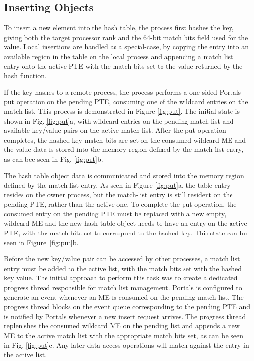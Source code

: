  

\subsection{Inserting Objects}

To insert a new element into the hash table, the process first hashes the key,
giving both the target processor rank and the 64-bit match bits field used for
the value. Local insertions are handled as a special-case, by copying the entry
into an available region in the table on the local process and appending a
match list entry onto the active PTE with the match bits set to the value
returned by the hash function.

If the key hashes to a remote process, the process performs a one-sided Portals
put operation on the pending PTE, consuming one of the wildcard entries on the
match list. This process is demonstrated in Figure \ref{fig:put}. The initial
state is shown in Fig. \ref{fig:put}a, with wildcard entries on the pending
match list and available key/value pairs on the active match list. After the
put operation completes, the hashed key match bits are set on the consumed
wildcard ME and the value data is stored into the memory region defined by the
match list entry, as can bee seen in Fig. \ref{fig:put}b.

The hash table object data is communicated and stored into the memory region defined by
the match list entry. As seen in Figure \ref{fig:put}a, the table entry
resides on the owner process, but the match-list entry is still resident
on the pending PTE, rather than the active one. To complete the put operation,
the consumed entry on the pending PTE must be replaced with a new empty,
wildcard ME and the new hash table object needs to have an entry on the active
PTE, with the match bits set to correspond to the hashed key. This state can be
seen in Figure~\ref{fig:put}b. 

Before the new key/value pair can be accessed by other processes, a match list
entry must be added to the active list, with the match bits set with the hashed
key value. The initial approach to perform this task was to create a dedicated
progress thread responsible for match list management. Portals is configured to
generate an event whenever an ME is consumed on the pending match list. The
progress thread blocks on the event queue corresponding to the pending PTE and
is notified by Portals whenever a new insert request arrives. The progress
thread replenishes the consumed wildcard ME on the pending list and appends a
new ME to the active match list with the appropriate match bits set, as can be
seen in Fig. \ref{fig:put}c. Any later data access operations will match
against the entry in the active list.


